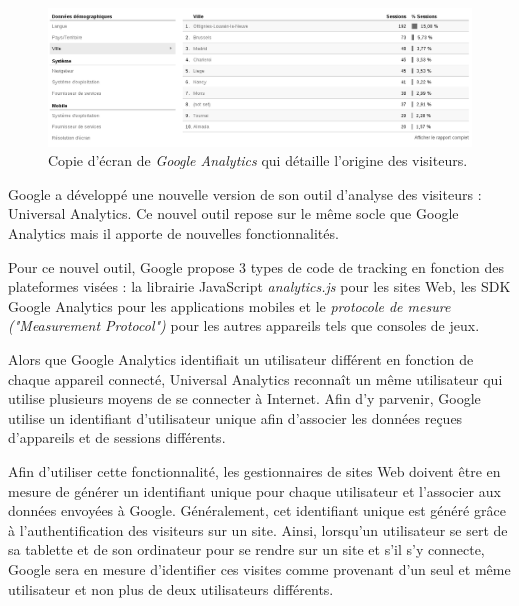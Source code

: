\begin{figure}[!h]
	\centering
	\includegraphics[scale=0.5]{figures/Google_Analytics_2_NB.png}
	\caption{\label{Google_Analytics_2}Copie d'écran de \textit{Google Analytics} qui détaille l'origine des visiteurs.}
\end{figure}

Google a développé une nouvelle version de son outil d'analyse des visiteurs : Universal Analytics. Ce nouvel outil repose sur le même socle que Google Analytics mais il apporte de nouvelles fonctionnalités.
\newline
\newpage

Pour ce nouvel outil, Google propose 3 types de code de tracking en fonction des plateformes visées : la librairie JavaScript \textit{analytics.js} pour les sites Web, les SDK Google Analytics pour les applications mobiles et le \textit{protocole de mesure ("Measurement Protocol")} pour les autres appareils tels que consoles de jeux.%
\newline

Alors que Google Analytics identifiait un utilisateur différent en fonction de chaque appareil connecté, Universal Analytics reconnaît un même utilisateur qui utilise plusieurs moyens de se connecter à Internet. Afin d'y parvenir, Google utilise un identifiant d'utilisateur unique afin d'associer les données reçues d'appareils et de sessions différents.
\newline

Afin d'utiliser cette fonctionnalité, les gestionnaires de sites Web doivent être en mesure de générer un identifiant unique pour chaque utilisateur et l'associer aux données envoyées à Google. Généralement, cet identifiant unique est généré grâce à l'authentification des visiteurs sur un site. Ainsi, lorsqu'un utilisateur se sert de sa tablette et de son ordinateur pour se rendre sur un site et s'il s'y connecte, Google sera en mesure d'identifier ces visites comme provenant d'un seul et même utilisateur et non plus de deux utilisateurs différents.
\newline

